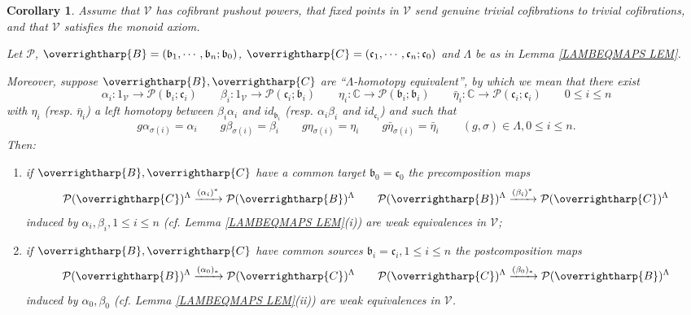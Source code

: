 \documentclass[a4paper,10pt
,draft
]{article}%
\numberwithin{equation}{section}
\numberwithin{figure}{section}
\newtheorem{corollary}[equation]{Corollary}%
\theoremstyle{definition} %
\newcommand{\vect}[1]{\text{\overrightharp{\ensuremath{#1}}}}
\newcommand{\V}{\ensuremath{\mathcal V}}
\renewcommand{\P}{\ensuremath{\mathcal P}}
\newcommand{\1}{\ensuremath{\mathbbm 1}}%
\begin{document}
\begin{corollary}\label{ALBEETA COR}
Assume that
{\color{blue} $\V$ has cofibrant pushout powers, that fixed points in $\V$ send genuine trivial cofibrations to trivial cofibrations, and that $\V$ satisfies the monoid axiom}.

Let $\P$, 
$\vect{B}=(\mathfrak{b}_1,\cdots,\mathfrak{b}_n;\mathfrak{b}_0)$,
$\vect{C}=(\mathfrak{c}_1,\cdots,\mathfrak{c}_n;\mathfrak{c}_0)$ 
and $\Lambda$ be as in 
Lemma \ref{LAMBEQMAPS LEM}.

Moreover, suppose 
$\vect{B},\vect{C}$
are ``$\Lambda$-homotopy equivalent'',
by which we mean that there exist 
\[
\alpha_i \colon 1_{\V} \to \P(\mathfrak{b}_i;\mathfrak{c}_i)
\qquad 
\beta_i \colon 1_{\V} \to \P(\mathfrak{c}_i;\mathfrak{b}_i)
\qquad
\eta_i \colon \mathbb{C} \to \P(\mathfrak{b}_i;\mathfrak{b}_i)
\qquad
\bar{\eta}_i \colon \mathbb{C} \to \P(\mathfrak{c}_i;\mathfrak{c}_i)
\qquad
0\leq i \leq n
\] 
with $\eta_i$ (resp. $\bar{\eta}_i$) a left homotopy between 
$\beta_i\alpha_i$ and $id_{\mathfrak{b}_i}$
(resp. 
$\alpha_i\beta_i$ and $id_{\mathfrak{c}_i}$)
and such that
\[
g \alpha_{\sigma(i)} = \alpha_i \qquad
g \beta_{\sigma(i)} = \beta_i \qquad
g \eta_{\sigma(i)} = \eta_i \qquad
g \bar{\eta}_{\sigma(i)} = \bar{\eta}_i \qquad
(g,\sigma) \in \Lambda,0\leq i \leq n.
\]
Then:
\begin{enumerate}[label=(\roman*)]
\item if $\vect{B},\vect{C}$ have a common target $\mathfrak{b}_0=\mathfrak{c}_0$ the precomposition maps
\[
\P(\vect{C})^{\Lambda} \xrightarrow{(\alpha_i)^{\**}} \P(\vect{B})^{\Lambda}
\qquad
\P(\vect{B})^{\Lambda} \xrightarrow{(\beta_i)^{\**}}
\P(\vect{C})^{\Lambda}
\]
induced by $\alpha_i,\beta_i,1\leq i \leq n$ 
(cf. Lemma \ref{LAMBEQMAPS LEM}(i)) are weak equivalences in $\V$;
\item if $\vect{B},\vect{C}$ have common sources $\mathfrak{b}_i=\mathfrak{c}_i, 1 \leq i \leq n$ the postcomposition maps
\[
\P(\vect{B})^{\Lambda} \xrightarrow{(\alpha_0)_{\**}}
\P(\vect{C})^{\Lambda}
\qquad
\P(\vect{C})^{\Lambda} \xrightarrow{(\beta_0)_{\**}}
\P(\vect{B})^{\Lambda}
\]
induced by $\alpha_0,\beta_0$
(cf. Lemma \ref{LAMBEQMAPS LEM}(ii))
are weak equivalences in $\V$.
\end{enumerate}
\end{corollary}
\end{document}
